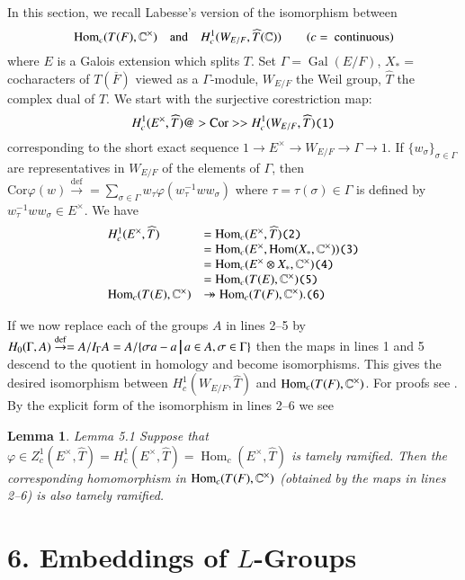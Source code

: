 \documentclass[11pt]{amsart}
\theoremstyle{plain}
\newtheorem{lemma}[theorem]{Lemma}
\theoremstyle{definition}
\def\taglet#1{\text{\tt (#1)}}
\def\Gal{\operatorname{\text{Gal}}}          %
\def\Com{{\Bbb C}}                         %
\def\suchthat{\ {\vrule width1truept height.3truecm depth.1truecm}\ }
\def\Hom{\operatorname{Hom}}         %
\def\Def{\overset{\operatorname{def}}\to=}   %
\def\LABESSEC{19}
\begin{document}
In this section, we recall Labesse's version \cite{\LABESSEC} of the isomorphism
between
$$
\Hom_c(T(F),\Com^\times)\quad\text{and}\quad
H_c^1(W_{E/F},\widehat T(\Com))
\qquad (c =\text{ continuous})
$$
where $E$ is a Galois extension which splits $T$.  Set
$\Gamma=\Gal(E/F)$, $X_* =$ cocharacters of $T(\overline F)$
viewed as a $\Gamma$-module, $W_{E/F}$ the Weil group, $\widehat T$ the
complex dual of $T$. We start with the 
surjective corestriction map:
$$
H_c^1(E^\times,\widehat T)@>{\text{Cor}}>> H_c^1(W_{E/F},
\widehat T)\taglet{1}
$$
corresponding to the short exact sequence
$
1\longrightarrow E^\times\longrightarrow W_{E/F}\longrightarrow
\Gamma\longrightarrow 1.
$
If $\{w_\sigma\}_{\sigma\in\Gamma}$ are 
representatives in $W_{E/F}$ of the elements
of $\Gamma$, then
$\text{Cor}\varphi(w)\Def\sum_{\sigma\in\Gamma}
w_\tau\varphi(w_\tau^{-1}ww_\sigma)$
where $\tau=\tau(\sigma)\in \Gamma$ is defined by
$w_\tau^{-1}ww_\sigma\in E^\times$.  We have
$$
\begin{array}{lll}
H_c^1(E^\times,\widehat T) &=
\Hom_c(E^\times,\widehat T)\taglet2\\
&=\Hom_c(E^\times,\Hom(X_*,\Com^\times)) \taglet3\\
&=\Hom_c(E^\times\otimes X_*,\Com^\times) \taglet4\\
&=\Hom_c(T(E),\Com^\times) \taglet5\\
\Hom_c(T(E),\Com^\times) &\twoheadrightarrow
\Hom_c(T(F),\Com^\times). \taglet6
\end{array}
$$

If we now replace each of the groups $A$ in lines 2--5
by $H_0(\Gamma,A)\Def A/I_\Gamma A
=A/\{\sigma a-a\suchthat
a\in A, \sigma\in \Gamma\}$
then the maps in lines 1 and 5 descend to the
quotient in homology and become isomorphisms.
This gives the desired isomorphism between
$H_c^1(W_{E/F},\widehat T)$ and
$\Hom_c(T(F),\Com^\times)$.  For proofs see \cite{\LABESSEC}.
By the explicit form of the isomorphism in lines
2--6 we see 

\begin{lemma}{Lemma 5.1}  Suppose that
$\varphi\in Z_c^1(E^\times,\widehat T)
=H_c^1(E^\times,\widehat T)
=\Hom_c(E^\times,\widehat T)$
is tamely ramified.  Then the corresponding homomorphism in
$\Hom_c(T(F),\Com^\times)$
(obtained by the maps in lines 2--6) is
also tamely ramified.
\end{lemma}

\section{6.  Embeddings of $L$-Groups}
\end{document}

